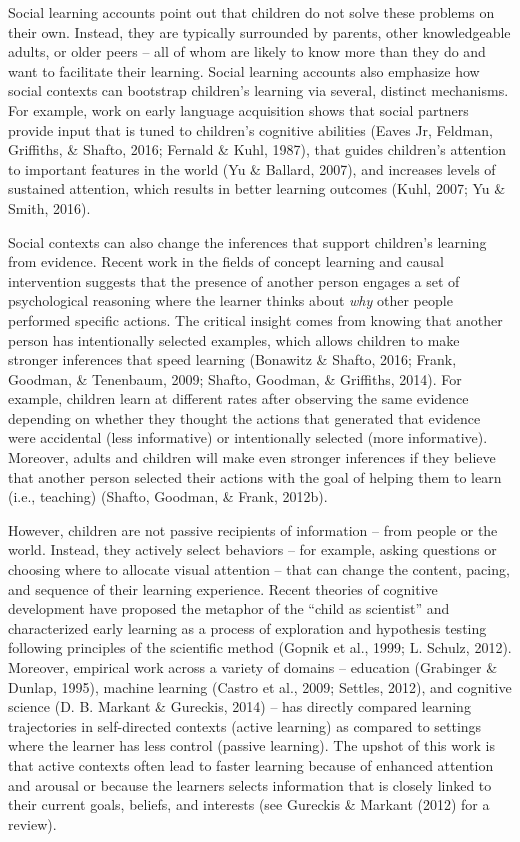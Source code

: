 \documentclass[oneside]{report}
\begin{document}
Social learning accounts point out that children do not solve these
problems on their own. Instead, they are typically surrounded by
parents, other knowledgeable adults, or older peers -- all of whom are
likely to know more than they do and want to facilitate their learning.
Social learning accounts also emphasize how social contexts can
bootstrap children's learning via several, distinct mechanisms. For
example, work on early language acquisition shows that social partners
provide input that is tuned to children's cognitive abilities (Eaves Jr,
Feldman, Griffiths, \& Shafto, 2016; Fernald \& Kuhl, 1987), that guides
children's attention to important features in the world (Yu \& Ballard,
2007), and increases levels of sustained attention, which results in
better learning outcomes (Kuhl, 2007; Yu \& Smith, 2016).

Social contexts can also change the inferences that support children's
learning from evidence. Recent work in the fields of concept learning
and causal intervention suggests that the presence of another person
engages a set of psychological reasoning where the learner thinks about
\emph{why} other people performed specific actions. The critical insight
comes from knowing that another person has intentionally selected
examples, which allows children to make stronger inferences that speed
learning (Bonawitz \& Shafto, 2016; Frank, Goodman, \& Tenenbaum, 2009;
Shafto, Goodman, \& Griffiths, 2014). For example, children learn at
different rates after observing the same evidence depending on whether
they thought the actions that generated that evidence were accidental
(less informative) or intentionally selected (more informative).
Moreover, adults and children will make even stronger inferences if they
believe that another person selected their actions with the goal of
helping them to learn (i.e., teaching) (Shafto, Goodman, \& Frank,
2012b).

However, children are not passive recipients of information -- from
people or the world. Instead, they actively select behaviors -- for
example, asking questions or choosing where to allocate visual attention
-- that can change the content, pacing, and sequence of their learning
experience. Recent theories of cognitive development have proposed the
metaphor of the ``child as scientist'' and characterized early learning
as a process of exploration and hypothesis testing following principles
of the scientific method (Gopnik et al., 1999; L. Schulz, 2012).
Moreover, empirical work across a variety of domains -- education
(Grabinger \& Dunlap, 1995), machine learning (Castro et al., 2009;
Settles, 2012), and cognitive science (D. B. Markant \& Gureckis, 2014)
-- has directly compared learning trajectories in self-directed contexts
(active learning) as compared to settings where the learner has less
control (passive learning). The upshot of this work is that active
contexts often lead to faster learning because of enhanced attention and
arousal or because the learners selects information that is closely
linked to their current goals, beliefs, and interests (see Gureckis \&
Markant (2012) for a review).
\end{document}
